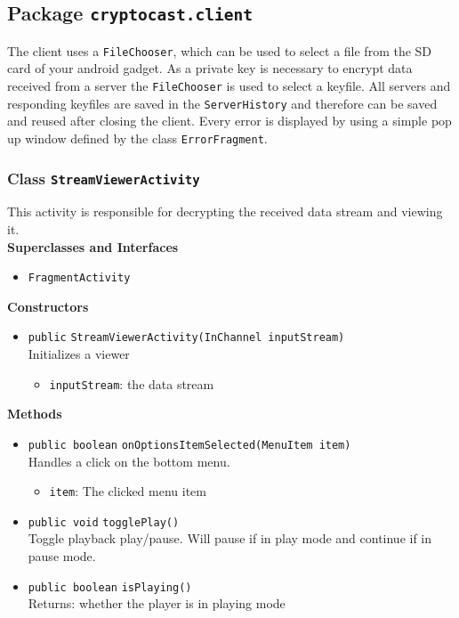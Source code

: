 \subsection{Package \lstinline!cryptocast.client!}
The client uses a \lstinline|FileChooser|, which can be used to select a file from the SD card of your android gadget.
 As a private key is necessary to encrypt data received from a server the \lstinline|FileChooser| is used to select a keyfile.
 All servers and responding keyfiles are saved in the \lstinline|ServerHistory| and therefore can be saved and reused after closing the client.
 Every error is displayed by using a simple pop up window defined by the class \lstinline|ErrorFragment|.
\subsubsection{Class \lstinline|StreamViewerActivity|}
This activity is responsible for decrypting the received data
 stream and viewing it. \\


\textbf{Superclasses and Interfaces}
\begin{itemize}
\item \lstinline|FragmentActivity|
\end{itemize}



\textbf{Constructors}
\begin{itemize}
\item \lstinline|public| \lstinline|StreamViewerActivity|\lstinline|(InChannel inputStream)|\\
Initializes a viewer
\begin{itemize}
\item \lstinline|inputStream|: the data stream
\end{itemize}



\end{itemize}


\textbf{Methods}
\begin{itemize}
\item \lstinline|public boolean| \lstinline|onOptionsItemSelected|\lstinline|(MenuItem item)|\\
Handles a click on the bottom menu.
\begin{itemize}
\item \lstinline|item|: The clicked menu item
\end{itemize}



\item \lstinline|public void| \lstinline|togglePlay|\lstinline|()|\\
Toggle playback play/pause. Will pause if in play mode and continue if
 in pause mode.



\item \lstinline|public boolean| \lstinline|isPlaying|\lstinline|()|\\
Returns: whether the player is in playing mode



\end{itemize}

